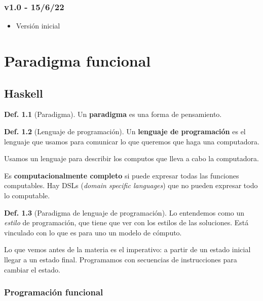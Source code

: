 \documentclass{report}
\theoremstyle{definition} %
\newtheorem{definition}{Def.}[chapter]
\begin{document}
\subsection*{v1.0 - 15/6/22}

\begin{itemize}
    \item Versión inicial
\end{itemize}

\chapter{Paradigma funcional}

\section{Haskell}

\begin{definition}[Paradigma]
    Un \textbf{paradigma} es una forma de pensamiento.
\end{definition}

\begin{definition}[Lenguaje de programación]
    Un \textbf{lenguaje de programación} es el lenguaje que usamos para
    comunicar lo que queremos que haga una computadora.

    Usamos un lenguaje para describir los computos que lleva a cabo la
    computadora.
    
    Es \textbf{computacionalmente completo} si puede expresar todas las
    funciones computables. Hay DSLs (\textit{domain specific languages}) que no
    pueden expresar todo lo computable.
\end{definition}

\begin{definition}[Paradigma de lenguaje de programación]
    Lo entendemos como un \textit{estilo} de programación, que tiene que ver con
    los estilos de las soluciones. Está vinculado con lo que es para uno un
    modelo de cómputo.

    Lo que vemos antes de la materia es el imperativo: a partir de un estado
    inicial llegar a un estado final. Programamos con secuencias de
    instrucciones para cambiar el estado.
\end{definition}

\subsection{Programación funcional}
\end{document}
